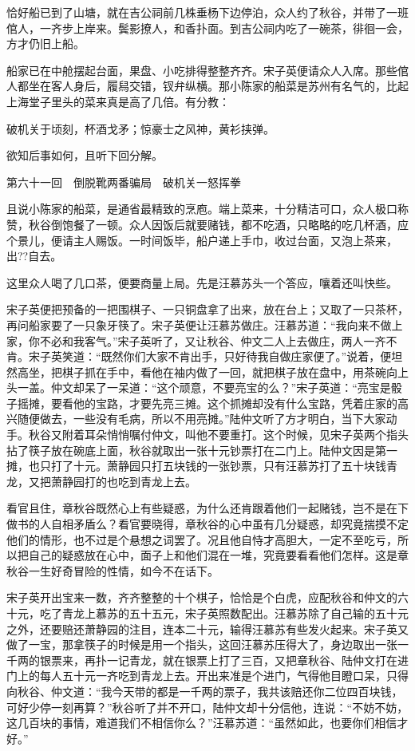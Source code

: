 \documentclass[12pt,UTF8]{ctexbook}
\begin{document}
{{{恰好船已到了山塘，就在吉公祠前几株垂杨下边停泊，众人约了秋谷，并带了一班倌人，一齐步上岸来。鬓影撩人，和香扑面。到吉公祠内吃了一碗茶，徘徊一会，方才仍旧上船。

船家已在中舱摆起台面，果盘、小吃排得整整齐齐。宋子英便请众人入席。那些倌人都坐在客人身后，履舄交错，钗弁纵横。那小陈家的船菜是苏州有名气的，比起上海堂子里头的菜来真是高了几倍。有分教：

破机关于顷刻，杯酒戈矛；惊豪士之风神，黄衫挟弹。

欲知后事如何，且听下回分解。





第六十一回　倒脱靴两番骗局　破机关一怒挥拳





且说小陈家的船菜，是通省最精致的烹庖。端上菜来，十分精洁可口，众人极口称赞，秋谷倒饱餐了一顿。众人因饭后就要赌钱，都不吃酒，只略略的吃几杯酒，应个景儿，便请主人赐饭。一时间饭毕，船户递上手巾，收过台面，又泡上茶来，出??自去。

这里众人喝了几口茶，便要商量上局。先是汪慕苏头一个答应，嚷着还叫快些。

宋子英便把预备的一把围棋子、一只铜盘拿了出来，放在台上；又取了一只茶杯，再问船家要了一只象牙筷了。宋子英便让汪慕苏做庄。汪慕苏道：“我向来不做上家，你不必和我客气。”宋子英听了，又让秋谷、仲文二人上去做庄，两人一齐不肯。宋子英笑道：“既然你们大家不肯出手，只好待我自做庄家便了。”说着，便坦然高坐，把棋子抓在手中，看他在袖内做了一回，就把棋子放在盘中，用茶碗向上头一盖。仲文却呆了一呆道：“这个顽意，不要亮宝的么？”宋子英道：“亮宝是骰子摇摊，要看他的宝路，才要先亮三摊。这个抓摊却没有什么宝路，凭着庄家的高兴随便做去，一些没有毛病，所以不用亮摊。”陆仲文听了方才明白，当下大家动手。秋谷又附着耳朵悄悄嘱付仲文，叫他不要重打。这个时候，见宋子英两个指头拈了筷子放在碗底上面，秋谷就取出一张十元钞票打在二门上。陆仲文因是第一摊，也只打了十元。萧静园只打五块钱的一张钞票，只有汪慕苏打了五十块钱青龙，又把萧静园打的也吃到青龙上去。

看官且住，章秋谷既然心上有些疑惑，为什么还肯跟着他们一起赌钱，岂不是在下做书的人自相矛盾么？看官要晓得，章秋谷的心中虽有几分疑惑，却究竟揣摸不定他们的情形，也不过是个悬想之词罢了。况且他自恃才高胆大，一定不至吃亏，所以把自己的疑惑放在心中，面子上和他们混在一堆，究竟要看看他们怎样。这是章秋谷一生好奇冒险的性情，如今不在话下。

宋子英开出宝来一数，齐齐整整的十个棋子，恰恰是个白虎，应配秋谷和仲文的六十元，吃了青龙上慕苏的五十五元，宋子英照数配出。汪慕苏除了自己输的五十元之外，还要赔还萧静园的注目，连本二十元，输得汪慕苏有些发火起来。宋子英又做了一宝，那拿筷子的时候是用一个指头，这回汪慕苏压得大了，身边取出一张一千两的银票来，再扑一记青龙，就在银票上打了三百，又把章秋谷、陆仲文打在进门上的每人五十元一齐吃到青龙上去。开出来准是个进门，气得他目瞪口呆，只得向秋谷、仲文道：“我今天带的都是一千两的票子，我共该赔还你二位四百块钱，可好少停一刻再算？”秋谷听了并不开口，陆仲文却十分信他，连说：“不妨不妨，这几百块的事情，难道我们不相信你么？”汪慕苏道：“虽然如此，也要你们相信才好。”

}}}
\end{document}
